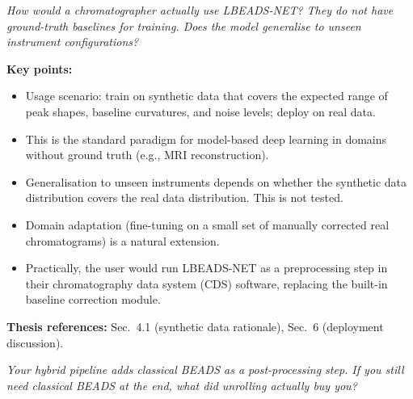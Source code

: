 \documentclass[11pt, letterpaper]{article}
\newcounter{qcounter}
\newcommand{\question}[1]{%
  \stepcounter{qcounter}%
  \begin{questionbox}[Q\theqcounter]%
    \itshape #1%
  \end{questionbox}%
}
\begin{document}
\question{How would a chromatographer actually use LBEADS-NET?  They do not
have ground-truth baselines for training.  Does the model
generalise to unseen instrument configurations?}

\begin{answerbox}
\textbf{Key points:}
\begin{itemize}[nosep]
  \item Usage scenario: train on synthetic data that covers the
        expected range of peak shapes, baseline curvatures, and
        noise levels; deploy on real data.
  \item This is the standard paradigm for model-based deep learning
        in domains without ground truth (e.g., MRI reconstruction).
  \item Generalisation to unseen instruments depends on whether
        the synthetic data distribution covers the real data
        distribution.  This is not tested.
  \item Domain adaptation (fine-tuning on a small set of manually
        corrected real chromatograms) is a natural extension.
  \item Practically, the user would run LBEADS-NET as a preprocessing
        step in their chromatography data system (CDS) software,
        replacing the built-in baseline correction module.
\end{itemize}
\textbf{Thesis references:} Sec.~4.1 (synthetic data rationale), Sec.~6 (deployment discussion).
\end{answerbox}

\question{Your hybrid pipeline adds classical BEADS as a post-processing
step.  If you still need classical BEADS at the end, what did
unrolling actually buy you?}
\end{document}

